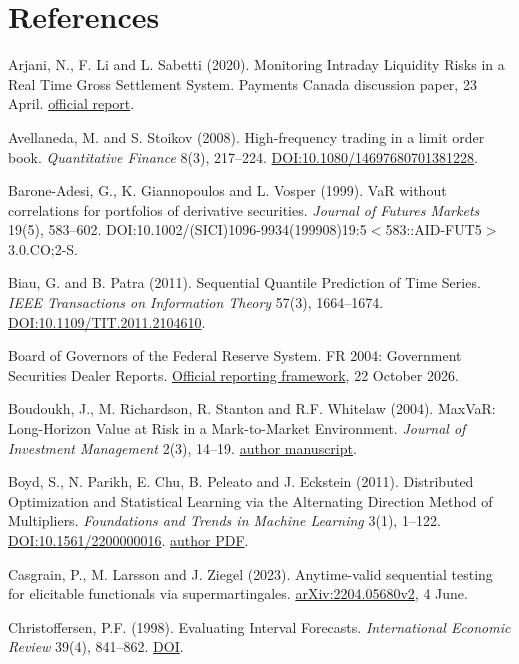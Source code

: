 \documentclass[10pt,a4paper]{article}
\begin{document}
\section*{References}
Arjani, N., F. Li and L. Sabetti (2020). Monitoring Intraday Liquidity Risks in a Real Time Gross Settlement System. Payments Canada discussion paper, 23 April. \href{https://www.payments.ca/sites/default/files/discussion_paper_monitoring_intraday_liquidity_risks_in_a_real_time_gross_settlement_system.pdf}{official report}.

Avellaneda, M. and S. Stoikov (2008). High-frequency trading in a limit order book. \emph{Quantitative Finance} 8(3), 217--224. \href{https://doi.org/10.1080/14697680701381228}{DOI:10.1080/14697680701381228}.

Barone-Adesi, G., K. Giannopoulos and L. Vosper (1999). VaR without correlations for portfolios of derivative securities. \emph{Journal of Futures Markets} 19(5), 583--602. DOI:10.1002/(SICI)1096-9934(199908)19:5\( < \)583::AID-FUT5\( > \)3.0.CO;2-S.

Biau, G. and B. Patra (2011). Sequential Quantile Prediction of Time Series. \emph{IEEE Transactions on Information Theory} 57(3), 1664--1674. \href{https://doi.org/10.1109/TIT.2011.2104610}{DOI:10.1109/TIT.2011.2104610}.

Board of Governors of the Federal Reserve System. FR 2004: Government Securities Dealer Reports. \href{https://www.federalreserve.gov/apps/reportingforms/Report/Index/FR_2004}{Official reporting framework}, 22 October 2026.

Boudoukh, J., M. Richardson, R. Stanton and R.F. Whitelaw (2004). MaxVaR: Long-Horizon Value at Risk in a Mark-to-Market Environment. \emph{Journal of Investment Management} 2(3), 14--19. \href{https://pages.stern.nyu.edu/~rwhitela/papers/maxvar.pdf}{author manuscript}.

Boyd, S., N. Parikh, E. Chu, B. Peleato and J. Eckstein (2011). Distributed Optimization and Statistical Learning via the Alternating Direction Method of Multipliers. \emph{Foundations and Trends in Machine Learning} 3(1), 1--122. \href{https://doi.org/10.1561/2200000016}{DOI:10.1561/2200000016}. \href{https://web.stanford.edu/~boyd/papers/pdf/admm_distr_stats.pdf}{author PDF}.

Casgrain, P., M. Larsson and J. Ziegel (2023). Anytime-valid sequential testing for elicitable functionals via supermartingales. \href{https://arxiv.org/abs/2204.05680v2}{arXiv:2204.05680v2}, 4 June.

Christoffersen, P.F. (1998). Evaluating Interval Forecasts. \emph{International Economic Review} 39(4), 841--862. \href{https://doi.org/10.2307/2527341}{DOI}.
\end{document}
